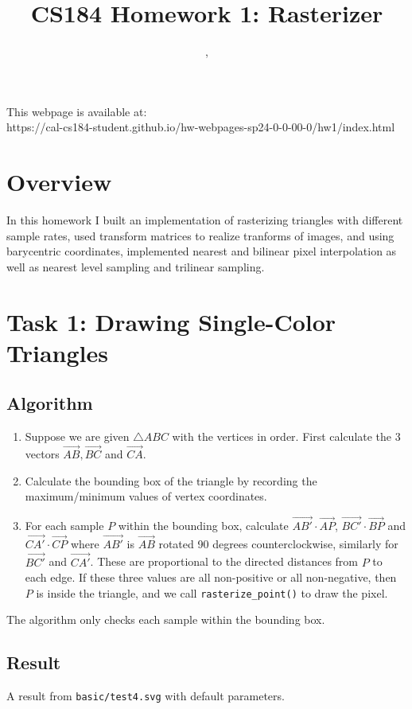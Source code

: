 \documentclass[11pt]{article}
\title{CS184 Homework 1: Rasterizer}
\author{\Name,  \SID\\\email}
\date{}
\begin{document}
\maketitle

This webpage is available at:\\ https://cal-cs184-student.github.io/hw-webpages-sp24-0-0-00-0/hw1/index.html

\section*{Overview}
In this homework I built an implementation of rasterizing triangles with different sample rates, used transform matrices to realize tranforms of images, and using barycentric coordinates, implemented nearest and bilinear pixel interpolation as well as nearest level sampling and trilinear sampling.

\section{Task 1: Drawing Single-Color Triangles}
\subsection{Algorithm}\begin{enumerate}
    \item Suppose we are given $\triangle{ABC}$ with the vertices in order. First calculate the 3 vectors $\vec{AB},\vec{BC}$ and $\vec{CA}$.
    \item Calculate the bounding box of the triangle by recording the maximum/minimum values of vertex coordinates.
    \item For each sample $P$ within the bounding box, calculate $\vec{AB'} \cdot\vec{AP}$, $\vec{BC'} \cdot\vec{BP}$ and $\vec{CA'} \cdot\vec{CP}$ where $\vec{AB'}$ is $\vec{AB}$ rotated 90 degrees counterclockwise, similarly for $\vec{BC'}$ and $\vec{CA'}$. These are proportional to the directed distances from $P$ to each edge. If these three values are all non-positive or all non-negative, then $P$ is inside the triangle, and we call \verb|rasterize_point()| to draw the pixel.
\end{enumerate}
The algorithm only checks each sample within the bounding box.
\subsection{Result}
A result from \verb|basic/test4.svg| with default parameters.\\
\end{document}
